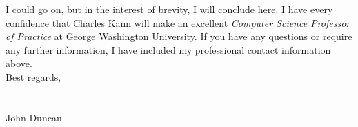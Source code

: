 \documentclass[11pt]{article}
\begin{document}
I could go on, but in the interest of brevity, I will conclude here. I have every confidence that Charles Kann will make an excellent \textit{Computer Science Professor of Practice} at George Washington University. If you have any questions or require any further information, I have included my professional contact information above.\\

Best regards,
\\\\\\
John Duncan\\
\end{document}
